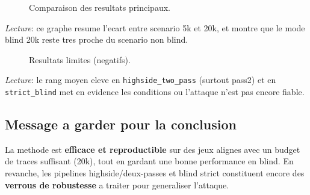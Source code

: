 \begin{figure}[h]
\centering

\caption{Comparaison des resultats principaux.}
\label{fig:comparaison-principaux}
\end{figure}

\noindent
\textit{Lecture}: ce graphe resume l'ecart entre scenario 5k et 20k, et montre que le mode blind 20k reste tres proche du scenario non blind.

\begin{figure}[h]
\centering

\caption{Resultats limites (negatifs).}
\label{fig:resultats-limites}
\end{figure}

\noindent
\textit{Lecture}: le rang moyen eleve en \texttt{highside\_two\_pass} (surtout pass2) et en \texttt{strict\_blind} met en evidence les conditions ou l'attaque n'est pas encore fiable.

\subsection{Message a garder pour la conclusion}
La methode est \textbf{efficace et reproductible} sur des jeux alignes avec un budget de traces suffisant (20k), tout en gardant une bonne performance en blind. En revanche, les pipelines highside/deux-passes et blind strict constituent encore des \textbf{verrous de robustesse} a traiter pour generaliser l'attaque.
